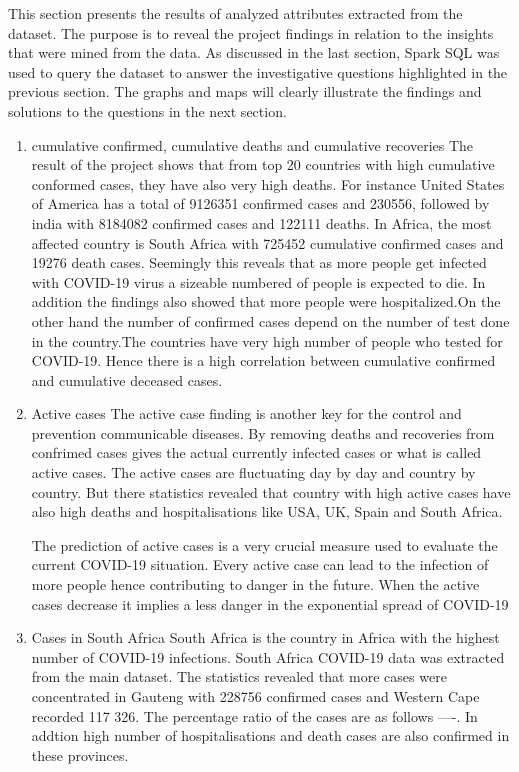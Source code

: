 \documentclass[12pt]{article}
\begin{document}
This section presents the results of analyzed attributes extracted from the dataset. The purpose is to reveal the project findings  in relation to the insights that were mined from the data. As discussed in the last section, Spark SQL was used to query the dataset to answer the  investigative questions highlighted in the previous section. The graphs and maps will clearly illustrate the findings and solutions to the  questions in the next section.  

\begin{enumerate}
    \item cumulative confirmed, cumulative deaths  and cumulative recoveries
    The result of the project shows that  from top 20 countries with high cumulative conformed cases, they have also very high deaths. For instance United States of America has a total of 9126351 confirmed cases and 230556, followed by india with 8184082 confirmed cases and 122111 deaths. In Africa, the most affected country is South Africa with 725452 cumulative confirmed cases and 19276 death cases. Seemingly this reveals that as more people get infected with COVID-19 virus a sizeable numbered of people is expected to die. In addition the findings also showed that more people were hospitalized.On the other hand the number of confirmed cases depend on the number of test done in the country.The countries have very high number of people who tested for COVID-19.  Hence there is a high correlation between cumulative confirmed and  cumulative deceased cases. 
    
    \item Active cases
    The active case finding is another key for the control and prevention communicable diseases. By removing deaths and recoveries from confrimed cases gives the actual currently infected cases or what is called active cases. The active cases are fluctuating day by day and country by country.  But  there statistics revealed that country with high active cases have also high deaths and hospitalisations like USA, UK, Spain and South Africa.
    
    The prediction of active cases is a very crucial measure used to evaluate the current COVID-19 situation. Every active case can lead to the infection of more people hence contributing to danger in the future. When the active cases decrease it implies a less danger in the  exponential spread of COVID-19
    
    \item Cases in South Africa
    South Africa is the country in Africa with the highest number of  COVID-19 infections. South Africa COVID-19 data was extracted from the main dataset. The statistics revealed that more cases were concentrated in Gauteng with 228756 confirmed cases and Western Cape recorded 117 326.  The percentage ratio of the cases are as follows ----. In addtion high  number of hospitalisations and death cases are also confirmed in these provinces. 
    

\end{enumerate}
\end{document}
